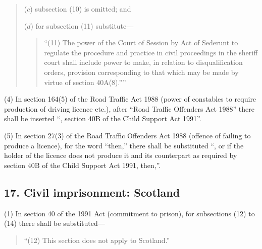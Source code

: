\documentclass[12pt,a4paper]{article}
\begin{document}
\begin{quotation}
\begin{enumerate}
($c$) subsection (10)  is omitted; and

($d$) for subsection (11)  substitute—
\begin{quotation}
“(11) The power of the Court of Session by Act of Sederunt to regulate the procedure and practice in civil proceedings in the sheriff court shall include power to make, in relation to disqualification orders, provision corresponding to that which may be made by virtue of section 40A(8).””
\end{quotation}
\end{enumerate}
\end{quotation}

(4) In section 164(5)  of the Road Traffic Act 1988 (power of constables to require production of driving licence etc.), after “Road Traffic Offenders Act 1988” there shall be inserted “, section 40B of the Child Support Act 1991”.

(5) In section 27(3)  of the Road Traffic Offenders Act 1988 (offence of failing to produce a licence), for the word “then,” there shall be substituted “, or if the holder of the licence does not produce it and its counterpart as required by section 40B of the Child Support Act 1991, then,”.


\subsection{17. Civil imprisonment: Scotland}

(1) In section 40 of the 1991 Act (commitment to prison), for subsections (12)  to (14)  there shall be substituted—
\begin{quotation}
“(12) This section does not apply to Scotland.”
\end{quotation}
\end{document}
